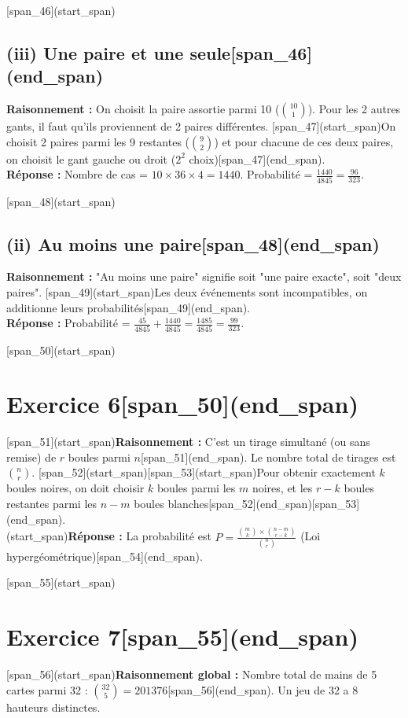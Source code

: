 \documentclass[11pt,a4paper]{article}
\begin{document}
[span_46](start_span)\subsection*{(iii) Une paire et une seule[span_46](end_span)}
\textbf{Raisonnement :} On choisit la paire assortie parmi 10 ($\binom{10}{1}$). Pour les 2 autres gants, il faut qu'ils proviennent de 2 paires différentes. [span_47](start_span)On choisit 2 paires parmi les 9 restantes ($\binom{9}{2}$) et pour chacune de ces deux paires, on choisit le gant gauche ou droit ($2^2$ choix)[span_47](end_span).\\
\textbf{Réponse :} Nombre de cas = $10 \times 36 \times 4 = 1440$. Probabilité = $\frac{1440}{4845} = \frac{96}{323}$.

[span_48](start_span)\subsection*{(ii) Au moins une paire[span_48](end_span)}
\textbf{Raisonnement :} "Au moins une paire" signifie soit "une paire exacte", soit "deux paires". [span_49](start_span)Les deux événements sont incompatibles, on additionne leurs probabilités[span_49](end_span).\\
\textbf{Réponse :} Probabilité = $\frac{45}{4845} + \frac{1440}{4845} = \frac{1485}{4845} = \frac{99}{323}$.

\hrulefill

[span_50](start_span)\section*{Exercice 6[span_50](end_span)}
[span_51](start_span)\textbf{Raisonnement :} C'est un tirage simultané (ou sans remise) de $r$ boules parmi $n$[span_51](end_span). Le nombre total de tirages est $\binom{n}{r}$. [span_52](start_span)[span_53](start_span)Pour obtenir exactement $k$ boules noires, on doit choisir $k$ boules parmi les $m$ noires, et les $r-k$ boules restantes parmi les $n-m$ boules blanches[span_52](end_span)[span_53](end_span).\\
[span_54](start_span)\textbf{Réponse :} La probabilité est $P = \frac{\binom{m}{k} \times \binom{n-m}{r-k}}{\binom{n}{r}}$ (Loi hypergéométrique)[span_54](end_span).

\hrulefill

[span_55](start_span)\section*{Exercice 7[span_55](end_span)}
[span_56](start_span)\textbf{Raisonnement global :} Nombre total de mains de 5 cartes parmi 32 : $\binom{32}{5} = 201376$[span_56](end_span). Un jeu de 32 a 8 hauteurs distinctes.
\end{document}
